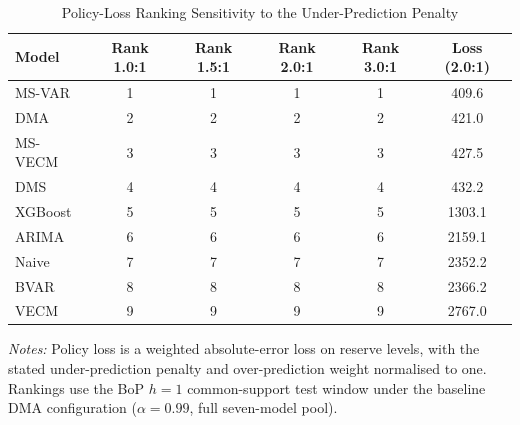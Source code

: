 \begin{table}[htbp]
\centering
\scriptsize
\caption{Policy-Loss Ranking Sensitivity to the Under-Prediction Penalty}
\label{tab:policy_loss_sensitivity}
\begin{tabular}{lccccc}
\toprule
Model & Rank 1.0:1 & Rank 1.5:1 & Rank 2.0:1 & Rank 3.0:1 & Loss (2.0:1) \\
\midrule
MS-VAR & 1 & 1 & 1 & 1 & 409.6 \\
DMA & 2 & 2 & 2 & 2 & 421.0 \\
MS-VECM & 3 & 3 & 3 & 3 & 427.5 \\
DMS & 4 & 4 & 4 & 4 & 432.2 \\
XGBoost & 5 & 5 & 5 & 5 & 1303.1 \\
ARIMA & 6 & 6 & 6 & 6 & 2159.1 \\
Naive & 7 & 7 & 7 & 7 & 2352.2 \\
BVAR & 8 & 8 & 8 & 8 & 2366.2 \\
VECM & 9 & 9 & 9 & 9 & 2767.0 \\
\bottomrule
\end{tabular}
\begin{tablenotes}
\footnotesize
\item \textit{Notes:} Policy loss is a weighted absolute-error loss on reserve levels, with the stated under-prediction penalty and over-prediction weight normalised to one. Rankings use the BoP $h=1$ common-support test window under the baseline DMA configuration ($\alpha=0.99$, full seven-model pool).
\end{tablenotes}
\end{table}